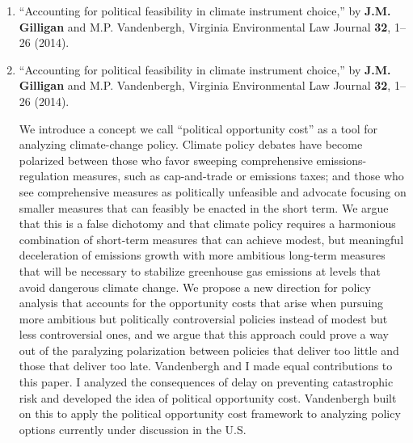 \begin{enumerate}
%
    \item 
	\enquote{Accounting for political feasibility in climate instrument choice,}  
	    by \textbf{J.M. Gilligan} and M.P. Vandenbergh, 
	    Virginia Environmental Law Journal
	    \textbf{32}, 1--26 (2014).
%
    \item 
	\enquote{Accounting for political feasibility in climate instrument choice,}  
	    by \textbf{J.M. Gilligan} and M.P. Vandenbergh, 
	    Virginia Environmental Law Journal
	    \textbf{32}, 1--26 (2014).
	  \begin{credit}
	  We introduce a concept we call ``political opportunity cost'' as a tool for analyzing climate-change policy. Climate policy debates have become polarized between those who favor sweeping comprehensive emissions-regulation measures, such as cap-and-trade or emissions taxes; and those who see comprehensive measures as politically unfeasible and advocate focusing on smaller measures that can feasibly be enacted in the short term. We argue that this is a false dichotomy and that climate policy requires a harmonious combination of short-term measures that can achieve modest, but meaningful deceleration of emissions growth with more ambitious long-term measures that will be necessary to stabilize greenhouse gas emissions at levels that avoid dangerous climate change. We propose a new direction for policy analysis that accounts for the opportunity costs that arise when pursuing more ambitious but politically controversial policies instead of modest but less controversial ones, and we argue that this approach could prove a way out of the paralyzing polarization between policies that deliver too little and those that deliver too late. 
	  Vandenbergh and I made equal contributions to this paper. I analyzed the consequences of delay on preventing catastrophic risk and developed the idea of political opportunity cost. 
	  Vandenbergh built on this to apply the political opportunity cost framework to analyzing policy options currently under discussion in the U.S.
	  \end{credit}
	  

\end{enumerate}
